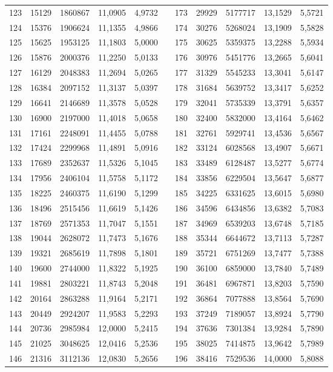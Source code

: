 \begin{longtable}{rrrrrrrrrrr}
123&15129&1860867&11,0905&4,9732&&173&29929&5177717&13,1529&5,5721\\
124&15376&1906624&11,1355&4,9866&&174&30276&5268024&13,1909&5,5828\\
125&15625&1953125&11,1803&5,0000&&175&30625&5359375&13,2288&5,5934\\
126&15876&2000376&11,2250&5,0133&&176&30976&5451776&13,2665&5,6041\\
127&16129&2048383&11,2694&5,0265&&177&31329&5545233&13,3041&5,6147\\
128&16384&2097152&11,3137&5,0397&&178&31684&5639752&13,3417&5,6252\\
129&16641&2146689&11,3578&5,0528&&179&32041&5735339&13,3791&5,6357\\
130&16900&2197000&11,4018&5,0658&&180&32400&5832000&13,4164&5,6462\\
131&17161&2248091&11,4455&5,0788&&181&32761&5929741&13,4536&5,6567\\
132&17424&2299968&11,4891&5,0916&&182&33124&6028568&13,4907&5,6671\\
133&17689&2352637&11,5326&5,1045&&183&33489&6128487&13,5277&5,6774\\
134&17956&2406104&11,5758&5,1172&&184&33856&6229504&13,5647&5,6877\\
135&18225&2460375&11,6190&5,1299&&185&34225&6331625&13,6015&5,6980\\
136&18496&2515456&11,6619&5,1426&&186&34596&6434856&13,6382&5,7083\\
137&18769&2571353&11,7047&5,1551&&187&34969&6539203&13,6748&5,7185\\
138&19044&2628072&11,7473&5,1676&&188&35344&6644672&13,7113&5,7287\\
139&19321&2685619&11,7898&5,1801&&189&35721&6751269&13,7477&5,7388\\
140&19600&2744000&11,8322&5,1925&&190&36100&6859000&13,7840&5,7489\\
141&19881&2803221&11,8743&5,2048&&191&36481&6967871&13,8203&5,7590\\
142&20164&2863288&11,9164&5,2171&&192&36864&7077888&13,8564&5,7690\\
143&20449&2924207&11,9583&5,2293&&193&37249&7189057&13,8924&5,7790\\
144&20736&2985984&12,0000&5,2415&&194&37636&7301384&13,9284&5,7890\\
145&21025&3048625&12,0416&5,2536&&195&38025&7414875&13,9642&5,7989\\
146&21316&3112136&12,0830&5,2656&&196&38416&7529536&14,0000&5,8088\\

\end{longtable}
